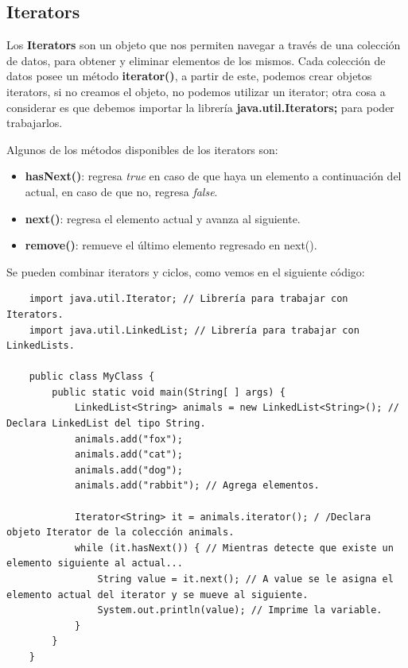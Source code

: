 \subsection{Iterators}
\hspace{0.55cm}Los \textbf{Iterators} son un objeto que nos permiten navegar a través de una colección de datos, para obtener y eliminar elementos de los mismos. Cada colección de datos posee un método \textbf{iterator()}, a partir de este, podemos crear objetos iterators, si no creamos el objeto, no podemos utilizar un iterator; otra cosa a considerar es que debemos importar la librería \textbf{java.util.Iterators;} para poder trabajarlos.

Algunos de los métodos disponibles de los iterators son:
\begin{itemize}
    \item \textbf{hasNext()}: regresa \textit{true} en caso de que haya un elemento a continuación del actual, en caso de que no, regresa \textit{false}.
    \item \textbf{next()}: regresa el elemento actual y avanza al siguiente.
    \item \textbf{remove()}: remueve el último elemento regresado en next().
\end{itemize}

Se pueden combinar iterators y ciclos, como vemos en el siguiente código:
\begin{lstlisting}
    import java.util.Iterator; // Librería para trabajar con Iterators.
    import java.util.LinkedList; // Librería para trabajar con LinkedLists.

    public class MyClass {
        public static void main(String[ ] args) {
            LinkedList<String> animals = new LinkedList<String>(); // Declara LinkedList del tipo String.
            animals.add("fox");
            animals.add("cat");
            animals.add("dog");
            animals.add("rabbit"); // Agrega elementos.
        
            Iterator<String> it = animals.iterator(); / /Declara objeto Iterator de la colección animals.
            while (it.hasNext()) { // Mientras detecte que existe un elemento siguiente al actual...
                String value = it.next(); // A value se le asigna el elemento actual del iterator y se mueve al siguiente.
                System.out.println(value); // Imprime la variable.
            }
        }
    }
\end{lstlisting}



